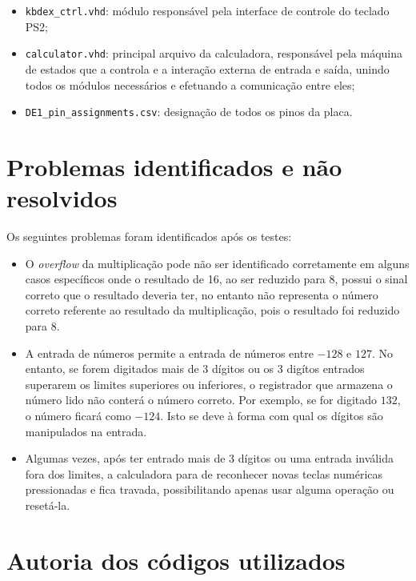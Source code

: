 \documentclass[a4paper, 12pt]{article}
\begin{document}
\begin{itemize}
    \item
    \texttt{kbdex\_ctrl.vhd}: módulo responsável pela interface de
    controle do teclado PS2;

    \item
    \texttt{calculator.vhd}: principal arquivo da calculadora,
    responsável pela máquina de estados que a controla e a interação
    externa de entrada e saída, unindo todos os módulos necessários
    e efetuando a comunicação entre eles;

    \item
    \texttt{DE1\_pin\_assignments.csv}: designação de todos
    os pinos da placa.
  \end{itemize}

  \section{Problemas identificados e não resolvidos}

  Os seguintes problemas foram identificados após os testes:

  \begin{itemize}
    \item
    O \emph{overflow} da multiplicação pode não ser identificado
    corretamente em alguns casos específicos onde o resultado
    de \SI{16}{\bits}, ao ser reduzido para \SI{8}{\bits},
    possui o sinal correto que o resultado deveria ter, no entanto
    não representa o número correto referente ao resultado da
    multiplicação, pois o resultado foi reduzido para \SI{8}{\bits}.

    \item
    A entrada de números permite a entrada de números entre
    $-128$ e $127$. No entanto, se forem digitados mais de 
    3 dígitos ou os 3 digítos entrados superarem os limites
    superiores ou inferiores, o registrador que armazena
    o número lido não conterá o número correto. Por exemplo,
    se for digitado $132$, o número ficará como $-124$. Isto
    se deve à forma com qual os dígitos são manipulados na
    entrada.

    \item
    Algumas vezes, após ter entrado mais de 3 dígitos ou uma
    entrada inválida fora dos limites, a calculadora para de
    reconhecer novas teclas numéricas pressionadas e fica
    travada, possibilitando apenas usar alguma operação ou
    resetá-la.
  \end{itemize}

  \section{Autoria dos códigos utilizados}
\end{document}
